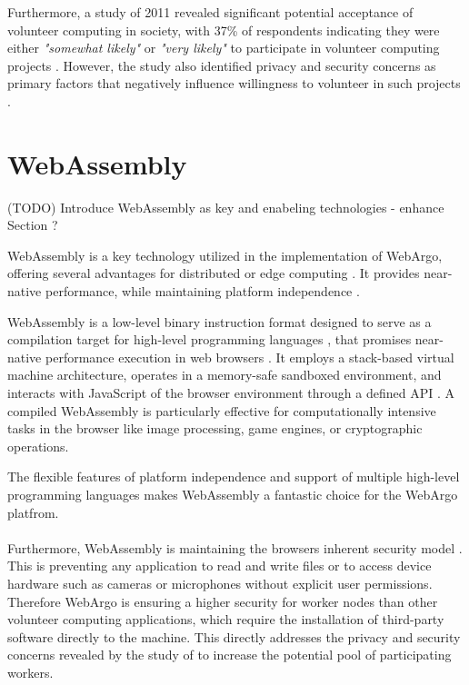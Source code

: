 Furthermore, a study of 2011 revealed significant potential acceptance of volunteer computing in society, with 37\% of respondents indicating they were either \emph{"somewhat likely"} or \emph{"very likely"} to participate in volunteer computing projects \cite{intro:volunteerStudy}. However, the study also identified privacy and security concerns as primary factors that negatively influence willingness to volunteer in such projects \cite{intro:volunteerStudy}.

\section{WebAssembly}
\label{sec:background:webassembly}
(TODO) Introduce WebAssembly as key and enabeling technologies - enhance Section ?

WebAssembly \cite{methodology:wasmW3C} is a key technology utilized in the implementation of WebArgo, offering several advantages for distributed or edge computing \cite{relatedwork:wasmedgecomputing}. It provides near-native performance, while maintaining platform independence \cite{methodology:wasm, methodology:wasmW3C, relatedwork:wasmedgecomputing}. 

WebAssembly is a low-level binary instruction format designed to serve as a compilation target for high-level programming languages \cite{methodology:wasm, methodology:wasmW3C, methodology:wasm2}, that promises near-native performance execution in web browsers \cite{methodology:wasm, methodology:wasmW3C, relatedwork:wasmedgecomputing}. It employs a stack-based virtual machine architecture, operates in a memory-safe sandboxed environment, and interacts with JavaScript of the browser environment through a defined \ac{API} \cite{methodology:wasm, methodology:wasmW3C, methodology:wasm2, methodology:wasmdocu}. A compiled WebAssembly is particularly effective for computationally intensive tasks in the browser \cite{methodology:wasm2, methodology:wasmW3C} like image processing, game engines, or cryptographic operations.

The flexible features of platform independence and support of multiple high-level programming languages makes WebAssembly a fantastic choice for the WebArgo platfrom.
\\~\\
Furthermore, WebAssembly is maintaining the browsers inherent security model \cite{methodology:wasmW3C, methodology:wasm2, methodology:wasmdocu}. This is preventing any application to read and write ﬁles or to access device hardware such as cameras or microphones without explicit user permissions. Therefore WebArgo is ensuring a higher security for worker nodes than other volunteer computing applications, which require the installation of third-party software directly to the machine. This directly addresses the privacy and security concerns revealed by the study of \citeauthor{intro:volunteerStudy} \cite{intro:volunteerStudy} to increase the potential pool of participating workers.

